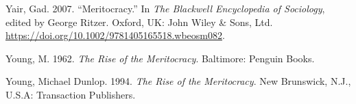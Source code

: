\documentclass[
]{article}
\begin{document}
\leavevmode\hypertarget{ref-yairMeritocracy2007}{}%
Yair, Gad. 2007. ``Meritocracy.'' In \emph{The Blackwell Encyclopedia of
Sociology}, edited by George Ritzer. Oxford, UK: John Wiley \& Sons,
Ltd. \url{https://doi.org/10.1002/9781405165518.wbeosm082}.

\leavevmode\hypertarget{ref-young_rise_1962}{}%
Young, M. 1962. \emph{The Rise of the Meritocracy}. Baltimore: Penguin
Books.

\leavevmode\hypertarget{ref-youngRiseMeritocracy1994}{}%
Young, Michael Dunlop. 1994. \emph{The Rise of the Meritocracy}. New
Brunswick, N.J., U.S.A: Transaction Publishers.
\end{document}
